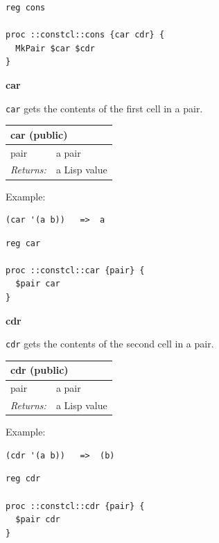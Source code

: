 \documentclass[twoside,9pt]{report}
\begin{document}
\noindent\makebox[\linewidth]{\rule{\linewidth}{0.4pt}}
\begin{lstlisting}
reg cons
 
proc ::constcl::cons {car cdr} {
  MkPair $car $cdr
}
\end{lstlisting}
\noindent\makebox[\linewidth]{\rule{\linewidth}{0.4pt}}

\textbf{car}


\texttt{car} gets the contents of the first cell in a pair.

\begin{tabular}{ |l l| }
\hline
\multicolumn{2}{|l|}{car (public)} \\
\hline
pair & a pair \\
\textit{Returns:} & a Lisp value \\
\hline
\end{tabular}


Example:

\noindent\makebox[\linewidth]{\rule{\linewidth}{0.4pt}}
\begin{lstlisting}
(car '(a b))   =>  a
\end{lstlisting}
\noindent\makebox[\linewidth]{\rule{\linewidth}{0.4pt}}
\noindent\makebox[\linewidth]{\rule{\linewidth}{0.4pt}}
\begin{lstlisting}
reg car
 
proc ::constcl::car {pair} {
  $pair car
}
\end{lstlisting}
\noindent\makebox[\linewidth]{\rule{\linewidth}{0.4pt}}

\textbf{cdr}


\texttt{cdr} gets the contents of the second cell in a pair.

\begin{tabular}{ |l l| }
\hline
\multicolumn{2}{|l|}{cdr (public)} \\
\hline
pair & a pair \\
\textit{Returns:} & a Lisp value \\
\hline
\end{tabular}


Example:

\noindent\makebox[\linewidth]{\rule{\linewidth}{0.4pt}}
\begin{lstlisting}
(cdr '(a b))   =>  (b)
\end{lstlisting}
\noindent\makebox[\linewidth]{\rule{\linewidth}{0.4pt}}
\noindent\makebox[\linewidth]{\rule{\linewidth}{0.4pt}}
\begin{lstlisting}
reg cdr
 
proc ::constcl::cdr {pair} {
  $pair cdr
}
\end{lstlisting}
\noindent\makebox[\linewidth]{\rule{\linewidth}{0.4pt}}
\end{document}
